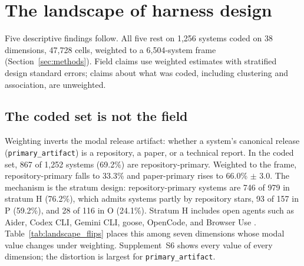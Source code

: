 \section{The landscape of harness design}
\label{sec:landscape}

Five descriptive findings follow. All five rest on 1,256 systems coded on 38 dimensions, 47,728 cells, weighted to a 6,504-system
frame (Section~\ref{sec:methods}). Field claims use weighted estimates with stratified design standard
errors; claims about what was coded, including clustering and association, are unweighted.

\subsection{The coded set is not the field}
\label{subsec:weighting}

Weighting inverts the modal release artifact: whether a system's canonical release
(\texttt{primary\_artifact}) is a repository, a paper, or a technical report. In the coded set, 867 of
1,252 systems (69.2\%) are repository-primary. Weighted to the frame, repository-primary falls to 33.3\%
and paper-primary rises to 66.0\% $\pm$ 3.0. The mechanism is the stratum design: repository-primary
systems are 746 of 979 in stratum H (76.2\%), which admits systems partly by repository stars, 93 of 157
in P (59.2\%), and 28 of 116 in O (24.1\%).
Stratum H includes open agents such as Aider, Codex CLI, Gemini CLI, goose, OpenCode, and Browser Use
\citep{aider,codexcli,geminicli,goose,opencode,browseruse}.
Table~\ref{tab:landscape_flips} places this among seven
dimensions whose modal value changes under weighting. Supplement~S6 shows every value of every
dimension; the distortion is largest for \texttt{primary\_artifact}.

